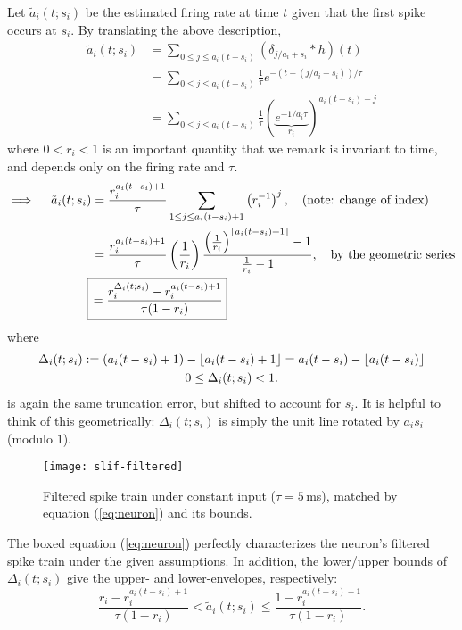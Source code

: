 Let $\tilde{a}_i(t; s_i)$ be the estimated firing rate at time $t$ given that the first spike occurs at $s_i$. By translating the above description,
\begin{align*}
\tilde{a}_i(t; s_i) &= \sum_{0 \le j \le a_i(t - s_i)} (\delta_{j / a_i + s_i} \ast h)(t) \\
&= \sum_{0 \le j \le a_i(t - s_i)} \frac{1}{\tau} e^{-(t - (j/a_i + s_i))/\tau} \\
&= \sum_{0 \le j \le a_i(t - s_i)} \frac{1}{\tau} (\underbrace{e^{-1/a_i \tau}}_{r_i})^{a_i(t - s_i) -j} 
\end{align*}
where $0 < r_i < 1$ is an important quantity that we remark is invariant to time, and depends only on the firing rate and $\tau$.
\begin{align}
\label{eq:neuron}
\implies \quad \tilde{a}_i(t; s_i) &= \frac{r_i^{a_i(t - s_i) + 1}}{\tau} \sum_{1 \le j \le a_i(t - s_i) + 1} \left( r_i^{-1} \right)^j, \quad \text{(note: change of index)} \nonumber \\
&= \frac{r_i^{a_i(t - s_i) + 1}}{\tau} \left( \frac{1}{r_i} \right) \frac{\left( \frac{1}{r_i} \right)^{\floor{a_i(t - s_i) + 1}} - 1}{\frac{1}{r_i} - 1}, \quad \text{by the geometric series} \nonumber \\
\Aboxed{ &\,= \frac{r_i^{\Delta_i(t; s_i)} - r_i^{a_i(t - s_i) + 1}}{\tau(1 - r_i)}}
\end{align}
where
\begin{equation}
\begin{gathered}
\label{eq:delta}
\Delta_i(t; s_i) := (a_i(t - s_i) + 1) - \lfloor {a_i(t - s_i) + 1} \rfloor = a_i(t - s_i) - \lfloor {a_i(t - s_i)} \rfloor \\
0 \le \Delta_i(t; s_i) < 1 .
\end{gathered}
\end{equation}
is again the same truncation error, but shifted to account for $s_i$. It is helpful to think of this geometrically: $\Delta_i(t; s_i)$ is simply the unit line rotated by $a_i s_i$ (modulo $1$).

\begin{figure}[h!]
\centering
\texttt{[image: slif-filtered]}
\caption{\label{fig:slif-filtered} Filtered spike train under constant input ($\tau = 5\,$ms), matched by equation (\ref{eq:neuron}) and its bounds.}
\end{figure}

The boxed equation (\ref{eq:neuron}) perfectly characterizes the neuron's filtered spike train under the given assumptions. In addition, the lower/upper bounds of $\Delta_i(t; s_i)$ give the upper- and lower-envelopes, respectively:
\begin{equation*}
\frac{r_i - r_i^{a_i(t - s_i) + 1}}{\tau(1 - r_i)} < \tilde{a}_i(t; s_i) \le \frac{1 - r_i^{a_i(t - s_i) + 1}}{\tau(1 - r_i)} .
\end{equation*}

